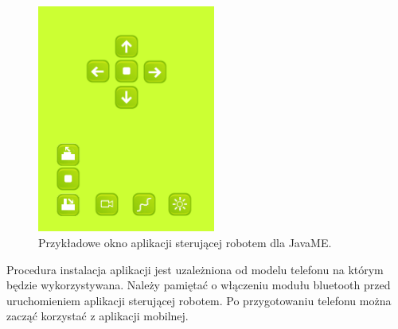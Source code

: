 \begin{figure}[!ht]
 \centering \includegraphics[height=75mm]{../images/ch05/java_me_app_screen.png}
 \caption{Przykładowe okno aplikacji sterującej robotem dla JavaME.}
 \label{fig:JavaMEApp}
\end{figure}

Procedura instalacja aplikacji jest uzależniona od modelu telefonu na którym
będzie wykorzystywana. Należy pamiętać o włączeniu modułu bluetooth przed
uruchomieniem aplikacji sterującej robotem. Po przygotowaniu telefonu można
zacząć korzystać z aplikacji mobilnej.